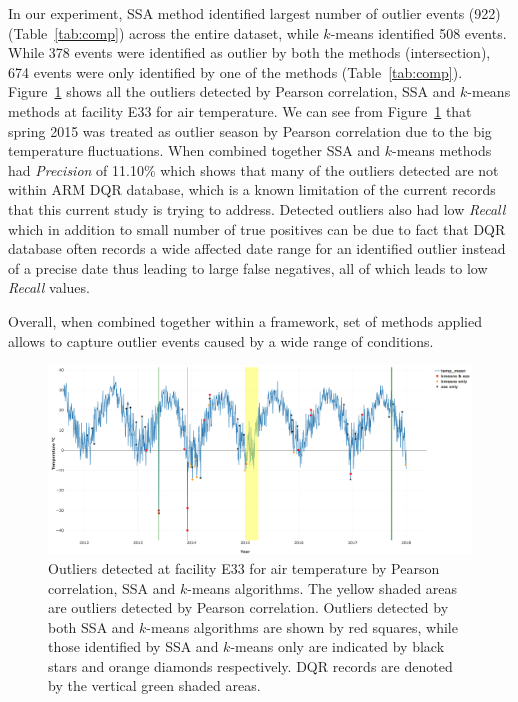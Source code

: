 In our experiment, SSA method identified largest number of outlier events (922)
(Table~\ref{tab:comp}) across the entire dataset, while $k$-means
identified 508 events. While 378 events were identified as outlier by
both the methods (intersection), 674 events were only identified by one
of the methods (Table~\ref{tab:comp}).
Figure~\ref{fig:combined} shows all the outliers detected by Pearson correlation, SSA and
$k$-means methods at facility E33 for air temperature. We can see from Figure~\ref{fig:combined}
that spring 2015 was treated as outlier season by Pearson correlation due to the big 
temperature fluctuations. When combined together SSA and $k$-means methods had
\textit{Precision} of 11.10\% which shows that many of the outliers
detected are not within ARM DQR database, which is a known limitation of
the current records that this current study is trying to address.
Detected outliers also had low \textit{Recall} which in addition to small
number of true positives can be due to fact that DQR database often
records a wide affected date range for an identified outlier instead of a
precise date thus leading to large false negatives, all of which leads
to low \textit{Recall} values.

Overall, when combined together within a framework, set of methods applied allows
to capture outlier events caused by a wide range of conditions. 

\begin{figure}[ht]
    \centering
    \includegraphics[width=\textwidth]{figures/combined.png}
    \caption{Outliers detected at facility E33 for air temperature
		by Pearson correlation, SSA and $k$-means algorithms. The yellow shaded areas are
		outliers detected by Pearson correlation. Outliers detected by both SSA and $k$-means
		algorithms are shown by red squares, while those identified by
		SSA and $k$-means only are indicated by black stars and orange
		diamonds respectively. DQR records are denoted by the vertical green shaded areas.}
    \label{fig:combined}
\end{figure}
